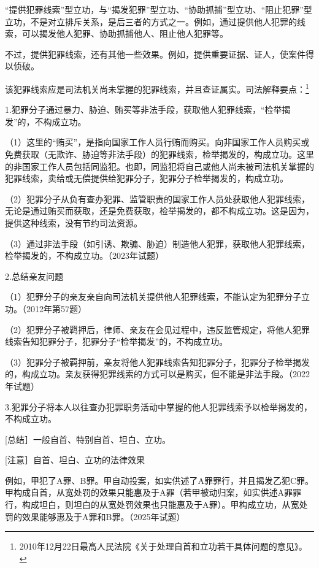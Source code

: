 “提供犯罪线索”型立功，与“揭发犯罪”型立功、“协助抓捕”型立功、“阻止犯罪”型立功，不是对立排斥关系，是后三者的方式之一。例如，通过提供他人犯罪的线索，可以揭发他人犯罪、协助抓捕他人、阻止他人犯罪等。

不过，提供犯罪线索，还有其他一些效果。例如，提供重要证据、证人，使案件得以侦破。

该犯罪线索应是司法机关尚未掌握的犯罪线索，并且查证属实。司法解释要点：\footnote{2010年12月22日最高人民法院《关于处理自首和立功若干具体问题的意见》。}

1.犯罪分子通过暴力、胁迫、贿买等非法手段，获取他人犯罪线索，“检举揭发”的，不构成立功。

（1）这里的“贿买”，是指向国家工作人员行贿而购买。向非国家工作人员购买或免费获取（无欺诈、胁迫等非法手段）的犯罪线索，检举揭发的，构成立功。这里的非国家工作人员包括同监犯。也即，同监犯将自己或他人尚未被司法机关掌握的犯罪线索，卖给或无偿提供给犯罪分子，犯罪分子检举揭发的，构成立功。

（2）犯罪分子从负有查办犯罪、监管职责的国家工作人员处获取他人犯罪线索，无论是通过贿买而获取，还是免费获取，检举揭发的，都不构成立功。这是因为，提供这种线索，没有节约司法资源。

（3）通过非法手段（如引诱、欺骗、胁迫）制造他人犯罪，获取他人犯罪线索，检举揭发的，不构成立功。（2023年试题）

2.总结亲友问题

（1）犯罪分子的亲友亲自向司法机关提供他人犯罪线索，不能认定为犯罪分子立功。（2012年第57题）

（2）犯罪分子被羁押后，律师、亲友在会见过程中，违反监管规定，将他人犯罪线索告知犯罪分子，犯罪分子“检举揭发”的，不构成立功。

（3）犯罪分子被羁押前，亲友将他人犯罪线索告知犯罪分子，犯罪分子检举揭发的，构成立功。亲友获得犯罪线索的方式可以是购买，但不能是非法手段。（2022年试题）

3.犯罪分子将本人以往查办犯罪职务活动中掌握的他人犯罪线索予以检举揭发的，不构成立功。

[总结］一般自首、特别自首、坦白、立功。


[注意］自首、坦白、立功的法律效果

例如，甲犯了A罪、B罪。甲自动投案，如实供述了A罪罪行，并且揭发乙犯C罪。甲构成自首，从宽处罚的效果只能惠及于A罪（若甲被动归案，如实供述A罪罪行，构成坦白，则坦白的从宽处罚效果也只能惠及于A罪）。甲构成立功，从宽处罚的效果能够惠及于A罪和B罪。（2025年试题）

